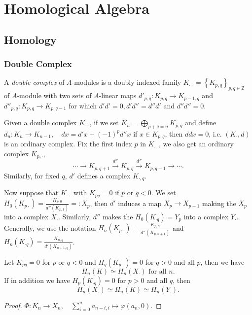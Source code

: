 \chapter{Homological Algebra}

\section{Homology}

\subsection{Double Complex}

A \emph{double complex} of \( A \)-modules is a doubly indexed family \( K_{\cdot \cdot} = \left\lbrace K_{p, q} \right\rbrace_{p, q \in \mathbb{Z}} \) of \( A \)-module with two sets of \( A \)-linear maps \( d'_{p, q}:K_{p, q} \to K_{p - 1, q} \) and \( d''_{p, q}: K_{p, q} \to K_{p, q - 1} \) for which \( d' d' = 0, d' d'' = d'' d' \) and \( d'' d'' = 0 \).

Given a double complex \( K_{\cdot \cdot} \), if we set \( K_n = \bigoplus_{p + q = n} K_{p, q} \) and define \( d_n: K_n \to K_{n - 1},\quad d x = d' x + (-1)^p d'' x \) if \( x \in K_{p, q} \), then \( ddx = 0 \), i.e. \( (K_{\cdot}, d) \) is an ordinary complex.
Fix the first index \( p \) in \( K_{\cdot \cdot} \), we also get an ordinary complex \( K_{p, \cdot} \),
\[
  \cdots \to K_{p, q + 1} \xrightarrow{d''} K_{p, q} \xrightarrow{d''} K_{p, q - 1} \to \cdots.
\]
Similarly, for fixed \( q \), \( d' \) defines a complex \( K_{\cdot, q} \).

Now suppose that \( K_{\cdot \cdot} \) with \( K_{pq} = 0 \) if \( p \) or \( q < 0 \).
We set \( H_0(K_{p \cdot}) = \frac{K_{p, 0}}{d''(K_{p, 1})} =: X_p \), then \( d' \) induces a map \( X_p \to X_{p - 1} \) making the \( X_p \) into a complex \( X_{\cdot} \).
Similarly, \( d'' \) makes the \( H_0(K_{\cdot q}) = Y_p \) into a complex \( Y_\cdot \).
Generally, we use the notation \( H_n(K_{p\cdot}) = \frac{K_{p, n}}{d''(K_{p, n + 1})} \) and \( H_n(K_{\cdot q}) = \frac{K_{n, q}}{d'(K_{n + 1, q})} \).

\begin{theorem}
  Let \( K_{pq} = 0 \) for \( p \) or \( q < 0 \) and \( H_q(K_{p \cdot}) = 0 \) for \( q > 0 \) and all \( p \), then we have
  \[
    H_n(K) \simeq H_n(X_\cdot) \text{ for all }n.
  \]
  If in addition we have \( H_p(K_{\cdot q}) = 0 \) for \( p > 0 \) and all \( q \), then
  \[
    H_n(X_{\cdot}) \simeq H_n(K) \simeq H_n(Y_{\cdot}).
  \]
\end{theorem}
\begin{proof}
  \( \Phi:K_n \to X_n,\quad \sum_{i = 0}^n a_{n - i, i} \mapsto \varphi(a_n, 0) \).
\end{proof}

